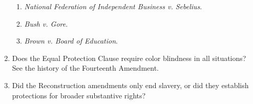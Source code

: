 \begin{enumerate}
\begin{enumerate}
        \item \emph{National Federation of Independent Business v. Sebelius}.
        \item \emph{Bush v. Gore}.
        \item \emph{Brown v. Board of Education}.
    \end{enumerate}
    \item Does the Equal Protection Clause require color blindness in all 
    situations? See the history of the Fourteenth Amendment.
    \item Did the Reconstruction amendments only end slavery, or did they 
    establish protections for broader substantive rights?
\end{enumerate}

